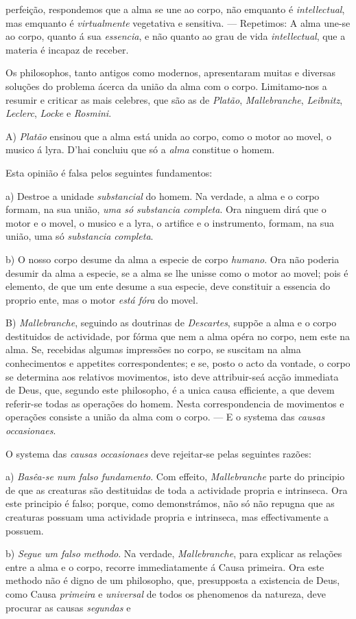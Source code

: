 perfeição, respondemos que a alma se une ao corpo, não emquanto é \emph{intellectual}, mas emquanto é \emph{virtualmente} vegetativa e sensitiva. --- Repetimos: A alma une-se ao corpo, quanto á sua \emph{essencia}, e não quanto ao grau de vida \emph{intellectual}, que a materia é incapaz de receber.\par *\par Os philosophos, tanto antigos como modernos, apresentaram muitas e diversas soluções do problema ácerca da união da alma com o corpo. Limitamo-nos a resumir e criticar as mais celebres, que são as de \emph{Platão}, \emph{Mallebranche}, \emph{Leibnitz}, \emph{Leclerc}, \emph{Locke} e \emph{Rosmini}.\par A) \emph{Platão} ensinou que a alma está unida ao corpo, como o motor ao movel, o musico á lyra. D'hai concluiu que só a \emph{alma} constitue o homem.\par Esta opinião é falsa pelos seguintes fundamentos:\par a) Destroe a unidade \emph{substancial} do homem. Na verdade, a alma e o corpo formam, na sua união, \emph{uma só substancia completa}. Ora ninguem dirá que o motor e o movel, o musico e a lyra, o artifice e o instrumento, formam, na sua união, uma só \emph{substancia completa}.\par b) O nosso corpo desume da alma a especie de corpo \emph{humano}. Ora não poderia desumir da alma a especie, se a alma se lhe unisse como o motor ao movel; pois é elemento, de que um ente desume a sua especie, deve constituir a essencia do proprio ente, mas o motor \emph{está fóra} do movel.\par B) \emph{Mallebranche}, seguindo as doutrinas de \emph{Descartes}, suppõe a alma e o corpo destituidos de actividade, por fórma que nem a alma opéra no corpo, nem este na alma. Se, recebidas algumas impressões no corpo, se suscitam na alma conhecimentos e appetites correspondentes; e se, posto o acto da vontade, o corpo se determina aos relativos movimentos, isto deve attribuir-seá acção immediata de Deus, que, segundo este philosopho, é a unica causa efficiente, a que devem referir-se todas as operações do homem. Nesta correspondencia de movimentos e operações consiste a união da alma com o corpo. --- E o systema das \emph{causas occasionaes}.\par O systema das \emph{causas occasionaes} deve rejeitar-se pelas seguintes razões:\par a) \emph{Basêa-se num falso fundamento}. Com effeito, \emph{Mallebranche} parte do principio de que as creaturas são destituidas de toda a actividade propria e intrinseca. Ora este principio é falso; porque, como demonstrámos, não só não repugna que as creaturas possuam uma actividade propria e intrinseca, mas effectivamente a possuem.\par b) \emph{Segue um falso methodo}. Na verdade, \emph{Mallebranche}, para explicar as relações entre a alma e o corpo, recorre immediatamente á Causa primeira. Ora este methodo não é digno de um philosopho, que, presupposta a existencia de Deus, como Causa \emph{primeira} e \emph{universal} de todos os phenomenos da natureza, deve procurar as causas \emph{segundas} e 
